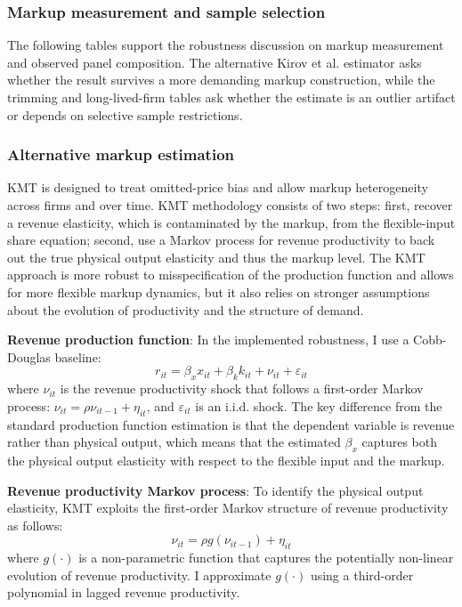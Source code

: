 ﻿\documentclass[12pt]{article}
\begin{document}
\small
\renewcommand{\arraystretch}{1}
\subsubsection{Markup measurement and sample selection}

The following tables support the robustness discussion on markup measurement and observed panel composition. The alternative Kirov et al. estimator asks whether the result survives a more demanding markup construction, while the trimming and long-lived-firm tables ask whether the estimate is an outlier artifact or depends on selective sample restrictions.

\subsubsection{Alternative markup estimation}

KMT is designed to treat omitted-price bias and allow markup heterogeneity across firms and over time. KMT methodology consists of two steps: first, recover a revenue elasticity, which is contaminated by the markup, from the flexible-input share equation; second, use a Markov process for revenue productivity to back out the true physical output elasticity and thus the markup level. The KMT approach is more robust to misspecification of the production function and allows for more flexible markup dynamics, but it also relies on stronger assumptions about the evolution of productivity and the structure of demand.

\textbf{Revenue production function}: In the implemented robustness, I use a Cobb-Douglas baseline:
\[r_{it} = \beta_x x_{it} + \beta_k k_{it} + \nu_{it} + \varepsilon_{it}\]
where $\nu_{it}$ is the revenue productivity shock that follows a first-order Markov process: $\nu_{it} = \rho \nu_{it-1} + \eta_{it}$, and $\varepsilon_{it}$ is an i.i.d. shock. The key difference from the standard production function estimation is that the dependent variable is revenue rather than physical output, which means that the estimated $\beta_x$ captures both the physical output elasticity with respect to the flexible input and the markup. 

\textbf{Revenue productivity Markov process}: To identify the physical output elasticity, KMT exploits the first-order Markov structure of revenue productivity as follows:
\[\nu_{it} = \rho g(\nu_{it-1}) + \eta_{it}\]
where $g(\cdot)$ is a non-parametric function that captures the potentially non-linear evolution of revenue productivity. I approximate $g(\cdot)$ using a third-order polynomial in lagged revenue productivity.
\end{document}
